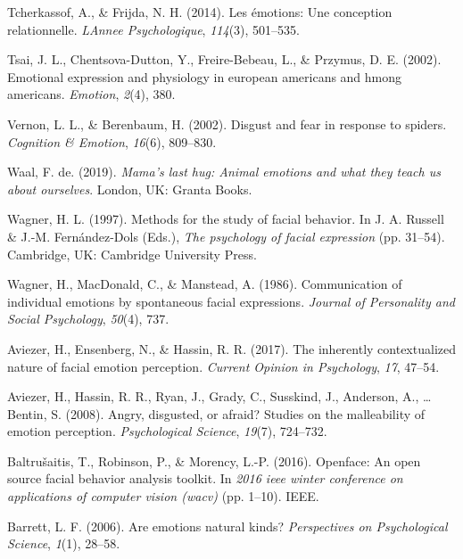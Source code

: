 \documentclass[man]{apa6}
\begin{document}
\leavevmode\hypertarget{ref-tcherkassof2014emotions}{}%
Tcherkassof, A., \& Frijda, N. H. (2014). Les émotions: Une conception relationnelle. \emph{LAnnee Psychologique}, \emph{114}(3), 501--535.

\leavevmode\hypertarget{ref-tsai2002emotional}{}%
Tsai, J. L., Chentsova-Dutton, Y., Freire-Bebeau, L., \& Przymus, D. E. (2002). Emotional expression and physiology in european americans and hmong americans. \emph{Emotion}, \emph{2}(4), 380.

\leavevmode\hypertarget{ref-vernon2002disgust}{}%
Vernon, L. L., \& Berenbaum, H. (2002). Disgust and fear in response to spiders. \emph{Cognition \& Emotion}, \emph{16}(6), 809--830.

\leavevmode\hypertarget{ref-de2019mama}{}%
Waal, F. de. (2019). \emph{Mama's last hug: Animal emotions and what they teach us about ourselves}. London, UK: Granta Books.

\leavevmode\hypertarget{ref-wagner1997methods}{}%
Wagner, H. L. (1997). Methods for the study of facial behavior. In J. A. Russell \& J.-M. Fernández-Dols (Eds.), \emph{The psychology of facial expression} (pp. 31--54). Cambridge, UK: Cambridge University Press.

\leavevmode\hypertarget{ref-wagner1986communication}{}%
Wagner, H., MacDonald, C., \& Manstead, A. (1986). Communication of individual emotions by spontaneous facial expressions. \emph{Journal of Personality and Social Psychology}, \emph{50}(4), 737.

\leavevmode\hypertarget{ref-aviezer2017inherently}{}%
Aviezer, H., Ensenberg, N., \& Hassin, R. R. (2017). The inherently contextualized nature of facial emotion perception. \emph{Current Opinion in Psychology}, \emph{17}, 47--54.

\leavevmode\hypertarget{ref-aviezer2008angry}{}%
Aviezer, H., Hassin, R. R., Ryan, J., Grady, C., Susskind, J., Anderson, A., \ldots{} Bentin, S. (2008). Angry, disgusted, or afraid? Studies on the malleability of emotion perception. \emph{Psychological Science}, \emph{19}(7), 724--732.

\leavevmode\hypertarget{ref-baltruvsaitis2016openface}{}%
Baltrušaitis, T., Robinson, P., \& Morency, L.-P. (2016). Openface: An open source facial behavior analysis toolkit. In \emph{2016 ieee winter conference on applications of computer vision (wacv)} (pp. 1--10). IEEE.

\leavevmode\hypertarget{ref-barrett2006emotions}{}%
Barrett, L. F. (2006). Are emotions natural kinds? \emph{Perspectives on Psychological Science}, \emph{1}(1), 28--58.
\end{document}
